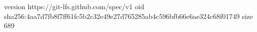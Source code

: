 version https://git-lfs.github.com/spec/v1
oid sha256:4aa7d7fb8f7ff61fc5b2c32e49e27d765285ab4c596bfb66e6ae324c68f01749
size 689
